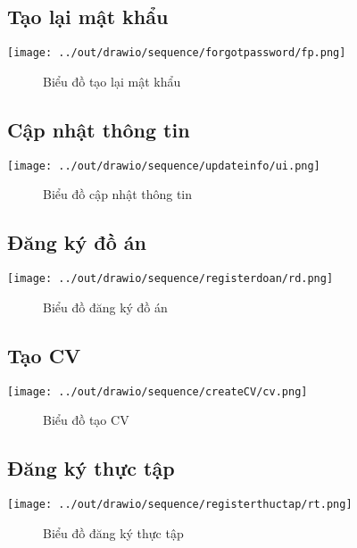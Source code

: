   \subsection*{Tạo lại mật khẩu}
    \begin{center}
      \texttt{[image: ../out/drawio/sequence/forgotpassword/fp.png]}
      \begin{figure}[h]
        \centering
        \caption{Biểu đồ tạo lại mật khẩu}
      \end{figure}
    \end{center}

  \subsection*{Cập nhật thông tin}
    \begin{center}
      \texttt{[image: ../out/drawio/sequence/updateinfo/ui.png]}
      \begin{figure}[h]
        \centering
        \caption{Biểu đồ cập nhật thông tin}
      \end{figure}
    \end{center}

  \subsection*{Đăng ký đồ án}
    \begin{center}
      \texttt{[image: ../out/drawio/sequence/registerdoan/rd.png]}
      \begin{figure}[h]
        \centering
        \caption{Biểu đồ đăng ký đồ án}
      \end{figure}
    \end{center}

  \subsection*{Tạo CV}
    \begin{center}
      \texttt{[image: ../out/drawio/sequence/createCV/cv.png]}
      \begin{figure}[h]
        \centering
        \caption{Biểu đồ tạo CV}
      \end{figure}
    \end{center}

  \subsection*{Đăng ký thực tập}
    \begin{center}
      \texttt{[image: ../out/drawio/sequence/registerthuctap/rt.png]}
      \begin{figure}[h]
        \centering
        \caption{Biểu đồ đăng ký thực tập}
      \end{figure}
    \end{center}

